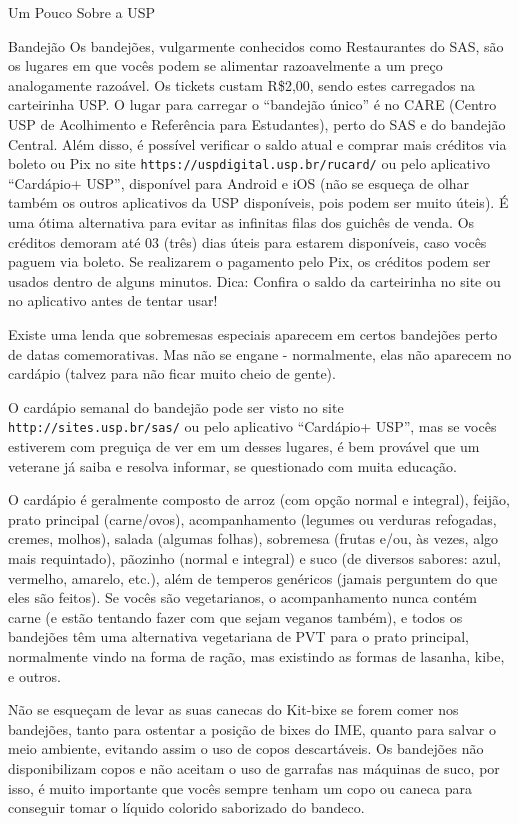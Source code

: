 \begin{secao}{Um Pouco Sobre a USP}
\begin{subsecao}{Bandejão}
Os bandejões, vulgarmente conhecidos como Restaurantes do SAS, são os lugares
em que vocês podem se alimentar razoavelmente a um preço analogamente razoável.
Os tickets custam R\$2,00, sendo estes carregados na carteirinha USP. O
lugar para carregar o ``bandejão único'' é no CARE (Centro USP de Acolhimento e 
Referência para Estudantes), perto do SAS e do bandejão Central. Além disso, é 
possível verificar o saldo atual e comprar mais créditos via boleto ou Pix no site
{\tt https://uspdigital.usp.br/rucard/} ou pelo aplicativo ``Cardápio+ USP'',
disponível para Android e iOS (não se esqueça de olhar também os outros
aplicativos da USP disponíveis, pois podem ser muito úteis).
É uma ótima alternativa para evitar as infinitas filas dos guichês de venda. Os
créditos demoram até 03 (três) dias úteis para estarem disponíveis, caso vocês
paguem via boleto. Se realizarem o pagamento pelo Pix, os créditos podem ser usados
dentro de alguns minutos.
Dica: Confira o saldo da carteirinha no site ou no aplicativo antes de tentar usar!

Existe uma lenda que sobremesas especiais aparecem em certos bandejões perto de
datas comemorativas. Mas não se engane - normalmente, elas não aparecem no
cardápio (talvez para não ficar muito cheio de gente).


O cardápio semanal do bandejão pode ser visto no site {\tt
http://sites.usp.br/sas/} ou pelo aplicativo ``Cardápio+ USP'', mas se vocês
estiverem com preguiça de ver em um desses lugares, é bem provável que um veterane 
já saiba e resolva informar, se questionado com muita educação.

O cardápio é geralmente composto de arroz (com opção normal e integral), feijão,
prato principal (carne/ovos), acompanhamento (legumes ou verduras refogadas,
cremes, molhos), salada (algumas folhas), sobremesa (frutas e/ou, às vezes, algo mais
requintado), pãozinho (normal e integral) e suco (de diversos sabores: azul, vermelho,
amarelo, etc.), além de temperos genéricos (jamais perguntem do que eles são feitos). 
Se vocês são vegetarianos, o acompanhamento nunca contém carne (e estão tentando 
fazer com que sejam veganos também), e todos os bandejões têm uma alternativa 
vegetariana de PVT para o prato principal, normalmente vindo na forma de ração,
mas existindo as formas de lasanha, kibe, e outros.


Não se esqueçam de levar as suas canecas do Kit-bixe se forem comer nos
bandejões, tanto para ostentar a posição de bixes do IME, quanto para salvar o
meio ambiente, evitando assim o uso de copos descartáveis. Os bandejões não 
disponibilizam copos e não aceitam o uso de garrafas nas máquinas de suco, por 
isso, é muito importante que vocês sempre tenham um copo ou caneca para conseguir 
tomar o líquido colorido saborizado do bandeco.



\end{subsecao}
\end{secao}
